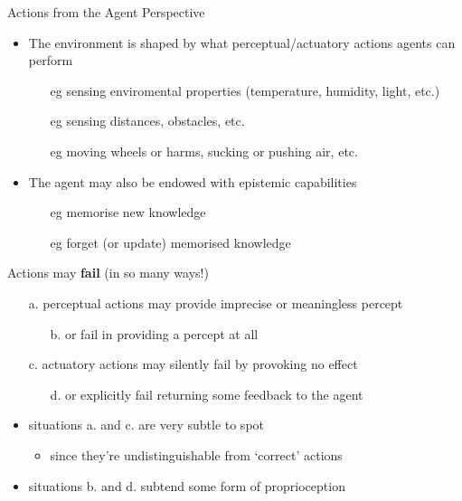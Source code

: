 \documentclass[presentation]{beamer}\mode<presentation>{\usetheme{AMSBolognaFC}}
\begin{document}
\begin{frame}[allowframebreaks]{Actions from the Agent Perspective}
    \begin{itemize}
        \item The environment is shaped by what perceptual/actuatory actions agents can perform
        \begin{itemize}
            \item[eg] sensing enviromental properties (temperature, humidity, light, etc.)
            \item[eg] sensing distances, obstacles, etc.
            \item[eg] moving wheels or harms, sucking or pushing air, etc. 
        \end{itemize}

        \bigskip

        \item The agent may also be endowed with \alert{epistemic} capabilities
        \begin{itemize}
            \item[eg] memorise new knowledge
            \item[eg] forget (or update) memorised knowledge
        \end{itemize}
    \end{itemize}

    \framebreak

    \begin{alertblock}{Actions may \textbf{fail} (in so many ways!)}
        \begin{itemize}
            \item[a.] perceptual actions may provide \alert{imprecise} or \alert{meaningless} percept
            \begin{itemize}
                \item[b.] or fail in providing a percept at all
            \end{itemize}

            \item[c.] actuatory actions may \alert{silently} fail by \alert{provoking no effect}
            \begin{itemize}
                \item[d.] or explicitly fail returning some feedback to the agent
            \end{itemize}
        \end{itemize}        
    \end{alertblock}
    \begin{itemize}
        \item situations \alert{a.} and \alert{c.} are very subtle to spot
        \begin{itemize}
            \item since they're undistinguishable from `correct' actions
        \end{itemize}

        \item situations \alert{b.} and \alert{d.} subtend some form of \alert{proprioception}
    \end{itemize}
\end{frame}
\end{document}
